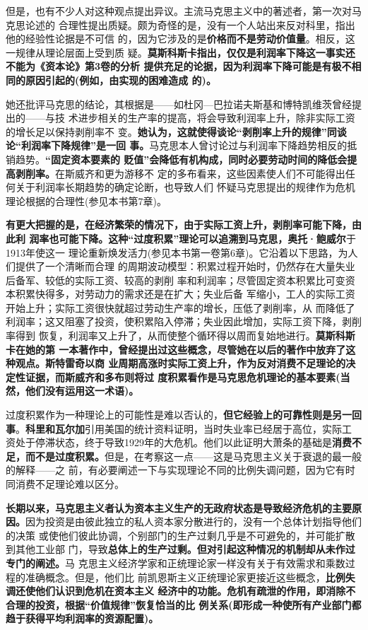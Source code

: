 但是，也有不少人对这种观点提出异议。主流马克思主义中的著述者，第一次对马克思论述的
合理性提出质疑。颇为奇怪的是，没有一个人站出来反对科里，指出他的经验性论据是不可信
的，因为它涉及的是\textbf{价格而不是劳动价值量}。相反，这一规律从理论层面上受到质
疑。\textbf{莫斯科斯卡指出，仅仅是利润率下降这一事实还不能为《资本论》第3卷的分析
提供充足的论据，因为利润率下降可能是有极不相同的原因引起的(例如，由实现的困难造成
的)。}

她还批评马克思的结论，其根据是——如杜冈—巴拉诺夫斯基和博特凯维茨曾经提出的——与技
术进步相关的生产率的提高，将会导致利润率上升，除非实际工资的增长足以保持剥削率不
变。\textbf{她认为，这就使得谈论“剥削率上升的规律”同谈论“利润率下降规律”是一回
事。}马克思本人曾讨论过与利润率下降趋势相反的抵销趋势。\textbf{“固定资本要素的
贬值”会降低有机构成，同时必要劳动时间的降低会提高剥削率。}在斯威齐和更为游移不
定的多布看来，这些因素使人们不可能得出任何关于利润率长期趋势的确定论断，也导致人们
怀疑马克思提出的规律作为危机理论根据的合理性(参见本书第7章)。

\textbf{有更大把握的是，在经济繁荣的情况下，由于实际工资上升，剥削率可能下降，由此利
润率也可能下降。这种“过度积累”理论可以追溯到马克思，奥托·鲍威尔}于1913年使这一
理论重新焕发活力(参见本书第一卷第6章)。它沿着以下思路，为人们提供了一个清晰而合理
的周期波动模型：积累过程开始时，仍然存在大量失业后备军、较低的实际工资、较高的剥削
率和利润率；尽管固定资本积累比可变资本积累快得多，对劳动力的需求还是在扩大；失业后备
军缩小，工人的实际工资开始上升；实际工资很快就超过劳动生产率的增长，压低了剥削率，从
而降低了利润率；这又阻塞了投资，使积累陷入停滞；失业因此增加，实际工资下降，剥削率得到
恢复，利润率又上升了，从而使整个循环得以周而复始地进行。\textbf{莫斯科斯卡在她的第
一本著作中，曾经提出过这些概念，尽管她在以后的著作中放弃了这种观点。斯特雷奇以商
业周期高涨时实际工资上升，作为反对消费不足理论的决定性证据，而斯威齐和多布则将过
度积累看作是马克思危机理论的基本要素(当然，他们没有运用这一术语)。}


过度积累作为一种理论上的可能性是难以否认的，\textbf{但它经验上的可靠性则是另一回
事}。\textbf{科里和瓦尔加}引用美国的统计资料证明，当时失业率已经居于高位，实际工
资处于停滞状态，终于导致1929年的大危机。他们以此证明大萧条的基础是\textbf{消费不
足，而不是过度积累。}但是，在考察这一点——这是马克思主义关于衰退的最一般的解释——之
前，有必要阐述一下与实现理论不同的比例失调问题，因为它有时同消费不足理论难以区分。


\textbf{长期以来，马克思主义者认为资本主义生产的无政府状态是导致经济危机的主要原
因。}因为投资是由彼此独立的私人资本家分散进行的，没有一个总体计划指导他们的决策
或使他们彼此协调，个别部门的生产过剩几乎是不可避免的，并可能扩散到其他工业部
门，导致\textbf{总体上的生产过剩。但对引起这种情况的机制却从未作过专门的阐述。}马
克思主义经济学家和正统理论家一样没有关于有效需求和乘数过程的准确概念。但是，他们比
前凯恩斯主义正统理论家更接近这些概念，\textbf{比例失调还使他们认识到危机在资本主义
经济中的功能。危机有疏泄的作用，即消除不合理的投资，根据“价值规律”恢复恰当的比
例关系(即形成一种使所有产业部门都趋于获得平均利润率的资源配置)。}

